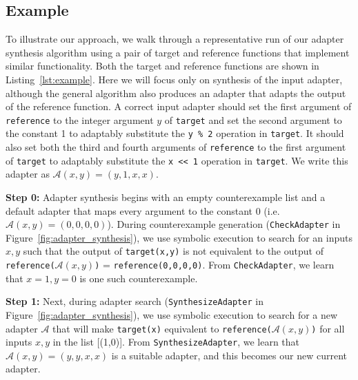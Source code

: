 % 

\subsection{Example}
%
\begin{figure}

\end{figure}
%
To illustrate our approach, we walk through a representative run of our adapter synthesis algorithm using a pair of target and reference functions that implement similar functionality.
%
Both the target and reference functions are shown in Listing~\ref{lst:example}. 
%
Here we will focus only on synthesis of the input adapter, although the general algorithm also produces an adapter that adapts the output of the reference function. 
%
A correct input adapter should set the first argument of \texttt{reference} to the integer argument $y$ of \texttt{target} and set the second argument to the constant 1 to adaptably substitute the \texttt{y \% 2} operation in \texttt{target}.
%
It should also set both the third and fourth arguments of \texttt{reference} to the first argument of \texttt{target} to adaptably substitute the \texttt{x << 1} operation in \texttt{target}. 
%
We write this adapter as $\mathcal{A}(x,y) = (y, 1, x, x)$.

\textbf{Step 0:} 
Adapter synthesis begins with an empty counterexample list and a default adapter that maps every argument to the constant 0 (i.e. $\mathcal{A}(x,y) = (0,0,0,0)$). During counterexample generation (\texttt{CheckAdapter} in Figure~\ref{fig:adapter_synthesis}), we use symbolic execution to search for an inputs $x,y$ such that the output of \texttt{target(x,y)} is not equivalent to the output of \texttt{reference(}$\mathcal{A}(x,y)$\texttt{)} = \texttt{reference(0,0,0,0)}. From \texttt{CheckAdapter}, we learn that $x = 1, y = 0$ is one such counterexample.
 
\textbf{Step 1:} Next, during adapter search (\texttt{SynthesizeAdapter} in Figure~\ref{fig:adapter_synthesis}), we use symbolic execution to search for a new adapter $\mathcal{A}$ that will make \texttt{target(x)} equivalent to \texttt{reference(}$\mathcal{A}(x,y)$\texttt{)} for all inputs $x,y$ in the list [(1,0)]. From \texttt{SynthesizeAdapter}, we learn that $\mathcal{A}(x,y) = (y,y,x,x)$ is a suitable adapter, and this becomes our new current adapter.

